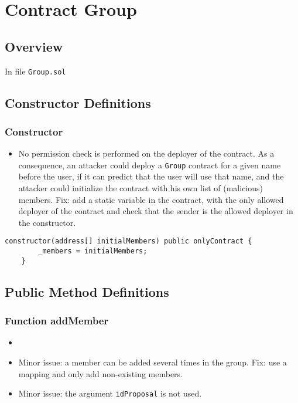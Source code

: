 
\chapter{Contract Group}

\minitoc

\section{Overview}

In file {\tt Group.sol}

\section{Constructor Definitions}

\subsection{Constructor}

\begin{itemize}
\item {}
  {No permission check is performed on the deployer of the contract.
    As a consequence, an attacker could deploy a {\tt Group} contract
    for a given name before the user, if it can predict that the user
    will use that name, and the attacker could initialize the contract
    with his own list of (malicious) members. Fix: add a static
    variable in the contract, with the only allowed deployer of the
    contract and check that the sender is the allowed deployer in the
    constructor. }
\end{itemize}

\begin{lstlisting}[firstnumber=15]
    constructor(address[] initialMembers) public onlyContract {
        _members = initialMembers;
    }
\end{lstlisting}

\section{Public Method Definitions}


\subsection{Function addMember}

\begin{itemize}
\item {}
\item Minor issue: a member can be added several times in the
  group. Fix: use a mapping and only add non-existing members.
\item Minor issue: the argument {\tt idProposal} is not used.
\end{itemize}

